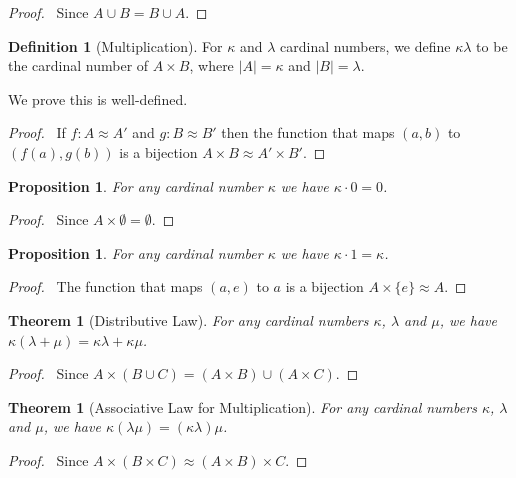 \documentclass{book}
\let\qed\relax
\newtheorem{prop}[ax]{Proposition}
\newtheorem{thm}[ax]{Theorem}
\theoremstyle{definition}
\newtheorem{df}[ax]{Definition}
\begin{document}
\begin{proof}
\pf\ Since $A \cup B = B \cup A$. \qed
\end{proof}

\begin{df}[Multiplication]
For $\kappa$ and $\lambda$ cardinal numbers, we define $\kappa \lambda$ to be the cardinal number of $A \times B$, where $|A| = \kappa$ and $|B| = \lambda$.

We prove this is well-defined.
\end{df}

\begin{proof}
\pf\ If $f : A \approx A'$ and $g : B \approx B'$ then the function that maps $(a,b)$ to $(f(a),g(b))$ is a bijection $A \times B \approx A' \times B'$. \qed
\end{proof}

\begin{prop}
For any cardinal number $\kappa$ we have $\kappa \cdot 0 = 0$.
\end{prop}

\begin{proof}
\pf\ Since $A \times \emptyset = \emptyset$. \qed
\end{proof}

\begin{prop}
For any cardinal number $\kappa$ we have $\kappa \cdot 1 = \kappa$.
\end{prop}

\begin{proof}
\pf\ The function that maps $(a,e)$ to $a$ is a bijection $A \times \{e\} \approx A$. \qed
\end{proof}

\begin{thm}[Distributive Law]
For any cardinal numbers $\kappa$, $\lambda$ and $\mu$, we have $\kappa(\lambda + \mu) = \kappa \lambda + \kappa \mu$.
\end{thm}

\begin{proof}
\pf\ Since $A \times (B \cup C) = (A \times B) \cup (A \times C)$. \qed
\end{proof}

\begin{thm}[Associative Law for Multiplication]
For any cardinal numbers $\kappa$, $\lambda$ and $\mu$, we have $\kappa (\lambda \mu) = (\kappa \lambda) \mu$.
\end{thm}

\begin{proof}
\pf\ Since $A \times (B \times C) \approx (A \times B) \times C$. \qed
\end{proof}
\end{document}
